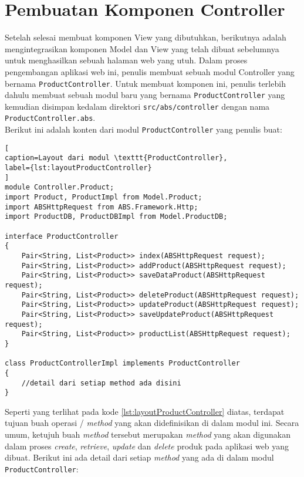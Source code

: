 \section{Pembuatan Komponen Controller}

Setelah selesai membuat komponen View yang dibutuhkan, berikutnya adalah mengintegrasikan komponen Model dan View yang telah dibuat sebelumnya untuk menghasilkan sebuah halaman web yang utuh. Dalam proses pengembangan aplikasi web ini, penulis membuat sebuah modul Controller yang bernama \texttt{ProductController}. Untuk membuat komponen ini, penulis terlebih dahulu membuat sebuah modul baru yang bernama \texttt{ProductController} yang kemudian disimpan kedalam direktori \texttt{src/abs/controller} dengan nama \texttt{ProductController.abs}.\\

Berikut ini adalah konten dari modul \texttt{ProductController} yang penulis buat:

\begin{lstlisting}[
caption=Layout dari modul \texttt{ProductController},
label={lst:layoutProductController}
]
module Controller.Product;
import Product, ProductImpl from Model.Product;
import ABSHttpRequest from ABS.Framework.Http;
import ProductDB, ProductDBImpl from Model.ProductDB;

interface ProductController
{
	Pair<String, List<Product>> index(ABSHttpRequest request);
	Pair<String, List<Product>> addProduct(ABSHttpRequest request);
	Pair<String, List<Product>> saveDataProduct(ABSHttpRequest request);
	Pair<String, List<Product>> deleteProduct(ABSHttpRequest request);
	Pair<String, List<Product>> updateProduct(ABSHttpRequest request);
	Pair<String, List<Product>> saveUpdateProduct(ABSHttpRequest request);
	Pair<String, List<Product>> productList(ABSHttpRequest request);
}

class ProductControllerImpl implements ProductController
{
	//detail dari setiap method ada disini
}
\end{lstlisting}

Seperti yang terlihat pada kode \ref{lst:layoutProductController} diatas, terdapat tujuan buah operasi / \textit{method} yang akan didefinisikan di dalam modul ini. Secara umum, ketujuh buah \textit{method} tersebut merupakan \textit{method} yang akan digunakan dalam proses \textit{create}, \textit{retrieve}, \textit{update} dan \textit{delete} produk pada aplikasi web yang dibuat. Berikut ini ada detail dari setiap \textit{method} yang ada di dalam modul \texttt{ProductController}:

